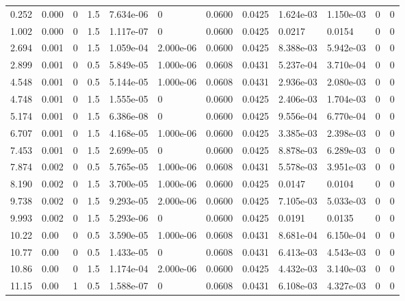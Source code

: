 \documentclass[preview]{standalone}
\begin{document}
{{\begin{tabular}{L{1.2cm}C{1.2cm} C{0.3cm}C{0.5cm} C{1.4cm}C{1.4cm} C{1.4cm}C{1.4cm} C{1.6cm}C{1.6cm} C{1.6cm}C{1.6cm}}
  0.252  &  0.000  & 0     & 1.5 &  7.634e-06  & 0  &  0.0600&   0.0425& 1.624e-03 & 1.150e-03   &  0 & 0  \\ 
  1.002  &  0.000  & 0     & 1.5 &  1.117e-07  & 0  &  0.0600&   0.0425& 0.0217 & 0.0154   &  0 & 0  \\ 
  2.694  &  0.001  & 0     & 1.5 &  1.059e-04  & 2.000e-06  &  0.0600&   0.0425& 8.388e-03 & 5.942e-03   &  0 & 0  \\ 
  2.899  &  0.001  & 0     & 0.5 &  5.849e-05  & 1.000e-06  &  0.0608&   0.0431& 5.237e-04 & 3.710e-04   &  0 & 0  \\ 
  4.548  &  0.001  & 0     & 0.5 &  5.144e-05  & 1.000e-06  &  0.0608&   0.0431& 2.936e-03 & 2.080e-03   &  0 & 0  \\ 
  4.748  &  0.001  & 0     & 1.5 &  1.555e-05  & 0  &  0.0600&   0.0425& 2.406e-03 & 1.704e-03   &  0 & 0  \\ 
  5.174  &  0.001  & 0     & 1.5 &  6.386e-08  & 0  &  0.0600&   0.0425& 9.556e-04 & 6.770e-04   &  0 & 0  \\ 
  6.707  &  0.001  & 0     & 1.5 &  4.168e-05  & 1.000e-06  &  0.0600&   0.0425& 3.385e-03 & 2.398e-03   &  0 & 0  \\ 
  7.453  &  0.001  & 0     & 1.5 &  2.699e-05  & 0  &  0.0600&   0.0425& 8.878e-03 & 6.289e-03   &  0 & 0  \\ 
  7.874  &  0.002  & 0     & 0.5 &  5.765e-05  & 1.000e-06  &  0.0608&   0.0431& 5.578e-03 & 3.951e-03   &  0 & 0  \\ 
  8.190  &  0.002  & 0     & 1.5 &  3.700e-05  & 1.000e-06  &  0.0600&   0.0425& 0.0147 & 0.0104   &  0 & 0  \\ 
  9.738  &  0.002  & 0     & 1.5 &  9.293e-05  & 2.000e-06  &  0.0600&   0.0425& 7.105e-03 & 5.033e-03   &  0 & 0  \\ 
  9.993  &  0.002  & 0     & 1.5 &  5.293e-06  & 0  &  0.0600&   0.0425& 0.0191 & 0.0135   &  0 & 0  \\ 
  10.22  &  0.00  & 0     & 0.5 &  3.590e-05  & 1.000e-06  &  0.0608&   0.0431& 8.681e-04 & 6.150e-04   &  0 & 0  \\ 
  10.77  &  0.00  & 0     & 0.5 &  1.433e-05  & 0  &  0.0608&   0.0431& 6.413e-03 & 4.543e-03   &  0 & 0  \\ 
  10.86  &  0.00  & 0     & 1.5 &  1.174e-04  & 2.000e-06  &  0.0600&   0.0425& 4.432e-03 & 3.140e-03   &  0 & 0  \\ 
  11.15  &  0.00  & 1     & 0.5 &  1.588e-07  & 0  &  0.0608&   0.0431& 6.108e-03 & 4.327e-03   &  0 & 0  \\ 

\end{tabular}}}
\end{document}
